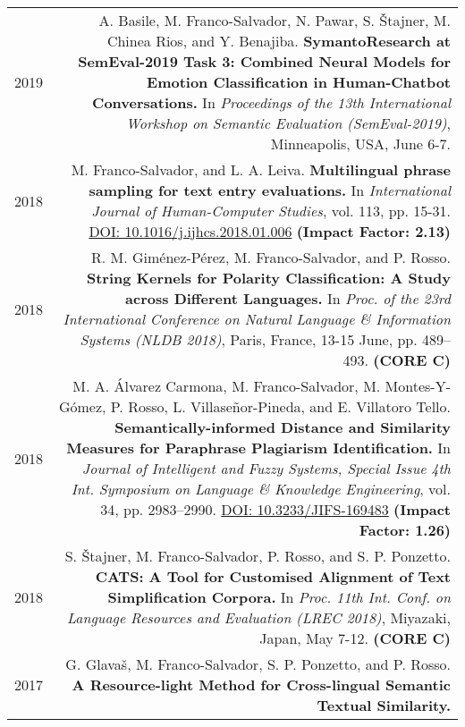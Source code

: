 \documentclass[10pt]{article}
\begin{document}
\section*{}
\begin{tabular}{L!{\VRule}R}	
    2019 & A. Basile, M. Franco-Salvador, N. Pawar, S. \v{S}tajner, M. Chinea Rios, and Y. Benajiba. \textbf{SymantoResearch at SemEval-2019 Task 3: Combined Neural Models for Emotion Classification in Human-Chatbot Conversations.}
	In \emph{Proceedings of the 13th International Workshop on Semantic Evaluation (SemEval-2019)}, Minneapolis, USA, June 6-7.\vspace{5pt}\\
    2018 & M. Franco-Salvador, and L. A. Leiva. \textbf{Multilingual phrase sampling for text entry evaluations.}
	In \emph{International Journal of Human-Computer Studies}, vol. 113, pp. 15-31. \href{https://doi.org/10.1016/j.ijhcs.2018.01.006}{DOI: 10.1016/j.ijhcs.2018.01.006} \textbf{(Impact Factor: 2.13)} \vspace{5pt}\\	
	2018& R. M. Gim{\'e}nez-P{\'e}rez, M. Franco-Salvador, and P. Rosso. \textbf{String Kernels for Polarity Classification: A Study across Different Languages.}
	In \emph{Proc. of the 23rd International Conference on Natural Language \& Information Systems (NLDB 2018)}, Paris, France, 13-15 June, pp. 489--493. \textbf{(CORE C)}\vspace{5pt}\\
	2018&M. A. {\'A}lvarez Carmona,  M. Franco-Salvador, M. Montes-Y-G{\'o}mez, P. Rosso, L. Villase{\~n}or-Pineda, and E. Villatoro Tello. \textbf{Semantically-informed Distance and Similarity Measures for Paraphrase Plagiarism Identification.}
	In \emph{Journal of Intelligent and Fuzzy Systems, Special Issue 4th Int. Symposium on Language \& Knowledge Engineering}, vol. 34, pp. 2983--2990. \href{https://doi.org/10.3233/JIFS-169483}{DOI: 10.3233/JIFS-169483} \textbf{(Impact Factor: 1.26)} \vspace{5pt}\\	
    2018 & S. \v{S}tajner, M. Franco-Salvador, P. Rosso, and S. P. Ponzetto. \textbf{CATS: A Tool for Customised Alignment of Text Simplification Corpora.} In \emph{Proc. 11th Int. Conf. on Language Resources and Evaluation (LREC 2018)}, Miyazaki, Japan, May 7-12. \textbf{(CORE C)} \vspace{5pt}\\
    2017 & G. Glava{\v s}, M. Franco-Salvador, S. P. Ponzetto, and P. Rosso. \textbf{A Resource-light Method for Cross-lingual Semantic Textual Similarity.}

\end{tabular}
\end{document}

